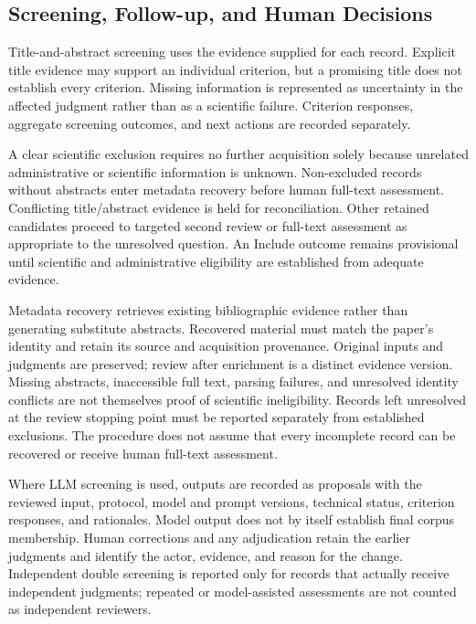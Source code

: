 \subsection{Screening, Follow-up, and Human Decisions}
\label{sec:methodology-screening}

Title-and-abstract screening uses the evidence supplied for each record. Explicit title evidence may support an individual criterion, but a promising title does not establish every criterion. Missing information is represented as uncertainty in the affected judgment rather than as a scientific failure. Criterion responses, aggregate screening outcomes, and next actions are recorded separately.

A clear scientific exclusion requires no further acquisition solely because unrelated administrative or scientific information is unknown. Non-excluded records without abstracts enter metadata recovery before human full-text assessment. Conflicting title/abstract evidence is held for reconciliation. Other retained candidates proceed to targeted second review or full-text assessment as appropriate to the unresolved question. An Include outcome remains provisional until scientific and administrative eligibility are established from adequate evidence.

Metadata recovery retrieves existing bibliographic evidence rather than generating substitute abstracts. Recovered material must match the paper's identity and retain its source and acquisition provenance. Original inputs and judgments are preserved; review after enrichment is a distinct evidence version. Missing abstracts, inaccessible full text, parsing failures, and unresolved identity conflicts are not themselves proof of scientific ineligibility. Records left unresolved at the review stopping point must be reported separately from established exclusions. The procedure does not assume that every incomplete record can be recovered or receive human full-text assessment.

Where LLM screening is used, outputs are recorded as proposals with the reviewed input, protocol, model and prompt versions, technical status, criterion responses, and rationales. Model output does not by itself establish final corpus membership. Human corrections and any adjudication retain the earlier judgments and identify the actor, evidence, and reason for the change. Independent double screening is reported only for records that actually receive independent judgments; repeated or model-assisted assessments are not counted as independent reviewers.

